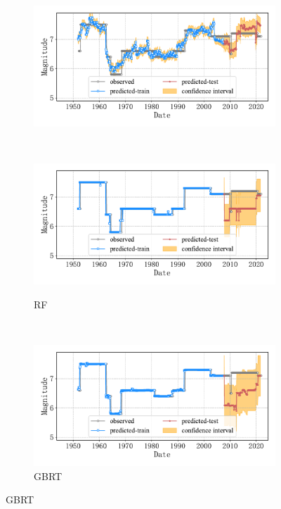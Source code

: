 \begin{figure}[!htbp]
\begin{subfigure}[b]{0.45\textwidth}
      \includegraphics[width=\textwidth]{Img/chap5_seism/future10/seism_lr_minyear_1932_maxyear_2021_spanlat_2_spanlon_4_timewindow_120_nextmonth_120_minmag_3.0_blocks1.pdf}
      \vspace{-1cm}
      \label{fig:seism_lr_minyear_1932_maxyear_2021_spanlat_2_spanlon_4_timewindow_120_nextmonth_120_minmag_3.0_blocks1}
  \end{subfigure}
  ~
  \begin{subfigure}[b]{0.45\textwidth}
    \caption{RF}
    \vspace{-0.2cm}
    \includegraphics[width=\textwidth]{Img/chap5_seism/future10/seism_rf_minyear_1932_maxyear_2021_spanlat_2_spanlon_4_timewindow_120_nextmonth_120_minmag_3.0_blocks1.pdf}
    \vspace{-1cm}
    \label{fig:seism_rf_minyear_1932_maxyear_2021_spanlat_2_spanlon_4_timewindow_120_nextmonth_120_minmag_3.0_blocks1}
  \end{subfigure}
  \\
  \begin{subfigure}[b]{0.45\textwidth}
    \caption{GBRT}
    \vspace{-0.2cm}
    \includegraphics[width=\textwidth]{Img/chap5_seism/future10/seism_gbr_minyear_1932_maxyear_2021_spanlat_2_spanlon_4_timewindow_120_nextmonth_120_minmag_3.0_blocks1.pdf}

\end{subfigure}
\end{figure}
